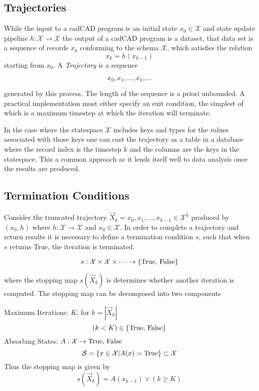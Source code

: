 \documentclass[]{article}
\begin{document}
\hypertarget{trajectories}{%
\subsection{Trajectories}\label{trajectories}}

While the input to a cadCAD program is an initial state
\(x_0\in\mathcal{X}\) and state update pipeline
\(h:\mathcal{X} \rightarrow \mathcal{X}\) the output of a cadCAD program
is a dataset, that data set is a sequence of records \(x_k\) conforming
to the schema \(\mathcal{X}\), which satisfies the relation \[
x_k = h(x_{k-1})
\] starting from \(x_0\). A \emph{Trajectory} is a sequence

\[
x_0, x_1, \ldots, x_k, \ldots
\]

generated by this process. The length of the sequence is a priori
unbounded. A practical implementation must either specify an exit
condition, the simplest of which is a maximum timestep at which the
iteration will terminate.

In the case where the statespace \(\mathcal{X}\) includes keys and types
for the values associated with those keys one can cast the trajectory as
a table in a database where the record index is the timestep \(k\) and
the columns are the keys in the statespace. This a common approach as it
lends itself well to data analysis once the results are produced.

\hypertarget{termination}{%
\subsection{Termination Conditions}\label{termination}}

Consider the truncated trajectory $\vec X_k= x_0,x_1, \ldots, x_{k-1} \in \mathcal{X}^{k}$ produced by $(x_0, h)$ where $h:\mathcal{X}\rightarrow \mathcal{X}$ and $x_0\in\mathcal{X}$. In order to complete a trajectory and return results it is necessary to define a termination condition $s$, such that when $s$ returns True, the iteration is terminated.

$$ s: \mathcal{X} \times \mathcal{X} \times \cdots \rightarrow {\hbox{\{True, False\}}} $$

where the stopping map $s(\vec X_k)$ is determines whether another iteration is computed. The stopping map can be decomposed into two components

Maximum Iterations: $K$, for $k=|\vec X_k|$ $$(k < K)\in {\hbox{\{True, False\}}}$$
Absorbing States: $A:\mathcal{X} \rightarrow {\hbox{True, False}}$ $$\mathcal{S} =\{x\in \mathcal{X} | A(x) = \hbox{True}\} \subset \mathcal{X}$$
Thus the stopping map is given by $$ s(\vec X_k) = A(x_{k-1}) \lor (k \ge K) $$
\end{document}
